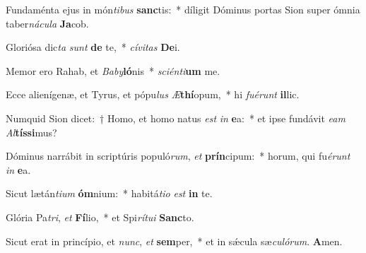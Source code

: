 \item Fundaménta ejus in món\textit{ti}\textit{bus} \textbf{sanc}tis:~* díligit Dóminus portas Sion super ómnia taber\textit{ná}\textit{cu}\textit{la} \textbf{Ja}cob.
\item Gloriósa dic\textit{ta} \textit{sunt} \textbf{de} te,~* \textit{cí}\textit{vi}\textit{tas} \textbf{De}i.
\item Memor ero Rahab, et \textit{Ba}\textit{by}\textbf{ló}nis~* \textit{sci}\textit{én}\textit{ti}\textbf{um} me.
\item Ecce alienígenæ, et Tyrus, et pópu\textit{lus} \textit{Æ}\textbf{thí}opum,~* hi \textit{fu}\textit{é}\textit{runt} \textbf{il}lic.
\item Numquid Sion dicet:~† Homo, et homo natus \textit{est} \textit{in} \textbf{e}a:~* et ipse fundávit \textit{e}\textit{am} \textit{Al}\textbf{tís}\textbf{si}mus?
\item Dóminus narrábit in scriptúris populó\textit{rum}, \textit{et} \textbf{prín}cipum:~* horum, qui fu\textit{é}\textit{runt} \textit{in} \textbf{e}a.
\item Sicut lætán\textit{ti}\textit{um} \textbf{óm}nium:~* habitá\textit{ti}\textit{o} \textit{est} \textbf{in} te.
\item Glória Pa\textit{tri}, \textit{et} \textbf{Fí}lio,~* et Spi\textit{rí}\textit{tu}\textit{i} \textbf{Sanc}to.
\item Sicut erat in princípio, et \textit{nunc}, \textit{et} \textbf{sem}per,~* et in sǽcula sæ\textit{cu}\textit{ló}\textit{rum}. \textbf{A}men.
